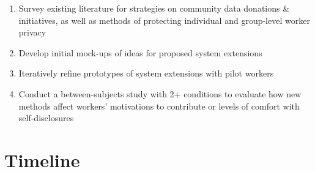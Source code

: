 
\begin{enumerate}
    \item Survey existing literature for strategies on community data donations \& initiatives, as well as methods of protecting individual and group-level worker privacy
    \item Develop initial mock-ups of ideas for proposed system extensions 
    \item Iteratively refine prototypes of system extensions with pilot workers
    \item Conduct a between-subjects study with 2+ conditions to evaluate how new methods affect workers' motivations to contribute or levels of comfort with self-disclosures
\end{enumerate}

\section{Timeline}